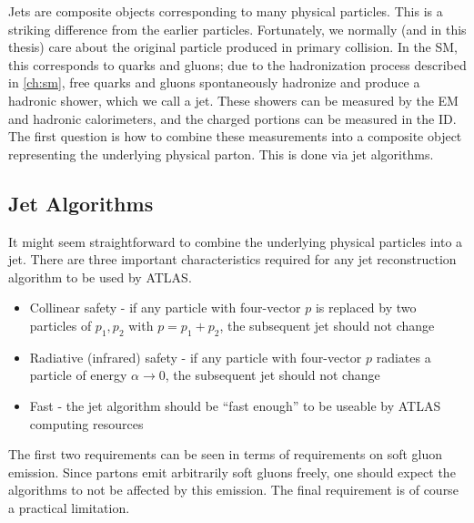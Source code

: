 Jets are composite objects corresponding to many physical particles.
This is a striking difference from the earlier particles.
Fortunately, we normally (and in this thesis) care about the original particle produced in primary collision.
In the SM, this corresponds to quarks and gluons; due to the hadronization process described in \ref{ch:sm}, free quarks and gluons spontaneously hadronize and produce a hadronic shower, which we call a jet.
These showers can be measured by the EM and hadronic calorimeters, and the charged portions can be measured in the ID.
The first question is how to combine these measurements into a composite object representing the underlying physical parton.
This is done via jet algorithms.

\subsection{Jet Algorithms}

It might seem straightforward to combine the underlying physical particles into a jet.
There are three important characteristics required for any jet reconstruction algorithm to be used by ATLAS.
\begin{itemize}
\item Collinear safety - if any particle with four-vector $p$ is replaced by two particles of $p_1, p_2$ with $p = p_1 + p_2$, the subsequent jet should not change
\item Radiative (infrared) safety - if any particle with four-vector $p$ radiates a particle of energy $\alpha \rightarrow 0$, the subsequent jet should not change
\item Fast - the jet algorithm should be ``fast enough'' to be useable by ATLAS computing resources
\end{itemize}
The first two requirements can be seen in terms of requirements on soft gluon emission.
Since partons emit arbitrarily soft gluons freely, one should expect the algorithms to not be affected by this emission.
The final requirement is of course a practical limitation.

